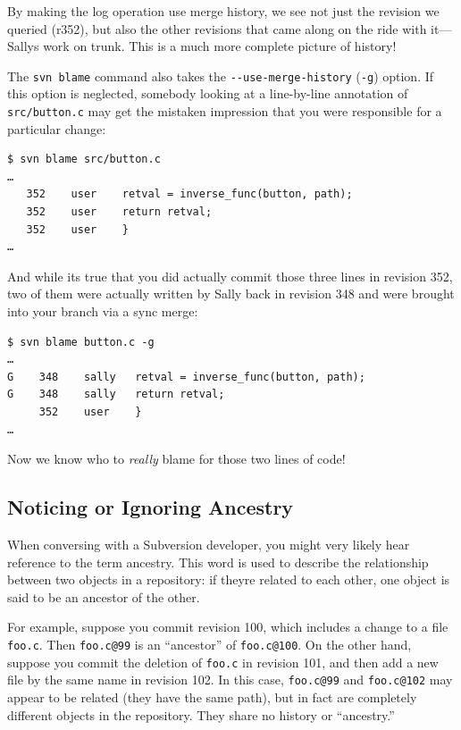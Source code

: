 By making the log operation use merge history, we see not just the
revision we queried (r352), but also the other revisions that came along
on the ride with it---Sally\textquotesingle s work on trunk. This is a
much more complete picture of history!

The \texttt{svn\ blame} command also takes the
\texttt{-\/-use-merge-history} (\texttt{-g}) option. If this option is
neglected, somebody looking at a line-by-line annotation of
\texttt{src/button.c} may get the mistaken impression that you were
responsible for a particular change:

\begin{verbatim}
$ svn blame src/button.c
…
   352    user    retval = inverse_func(button, path);
   352    user    return retval;
   352    user    }
…
\end{verbatim}

And while it\textquotesingle s true that you did actually commit those
three lines in revision 352, two of them were actually written by Sally
back in revision 348 and were brought into your branch via a sync merge:

\begin{verbatim}
$ svn blame button.c -g
…
G    348    sally   retval = inverse_func(button, path);
G    348    sally   return retval;
     352    user    }
…
\end{verbatim}

Now we know who to \emph{really} blame for those two lines of code!

\subsection{Noticing or Ignoring
Ancestry}\label{svn.branchmerge.advanced.ancestry}

When conversing with a Subversion developer, you might very likely hear
reference to the term ancestry. This word is used to describe the
relationship between two objects in a repository: if
they\textquotesingle re related to each other, one object is said to be
an ancestor of the other.

For example, suppose you commit revision 100, which includes a change to
a file \texttt{foo.c}. Then \texttt{foo.c@99} is an ``ancestor'' of
\texttt{foo.c@100}. On the other hand, suppose you commit the deletion
of \texttt{foo.c} in revision 101, and then add a new file by the same
name in revision 102. In this case, \texttt{foo.c@99} and
\texttt{foo.c@102} may appear to be related (they have the same path),
but in fact are completely different objects in the repository. They
share no history or ``ancestry.''

